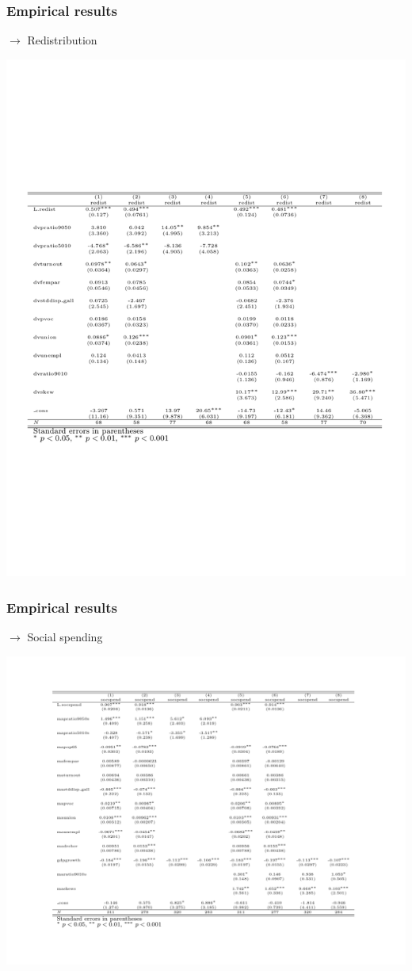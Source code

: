 \documentclass{beamer}
\begin{document}
\begin{frame}
\begin{itemize}
\begin{frame}
\frametitle{Empirical results}
$\longrightarrow$ Redistribution
\begin{center}
\includegraphics[scale=0.35]{tab2}
\end{center}
\end{frame}

\begin{frame}
\frametitle{Empirical results}
$\longrightarrow$ Social spending
\begin{center}
\includegraphics[scale=0.35]{tab3}
\end{center}
\end{frame}



\end{itemize}
\end{frame}
\end{document}

